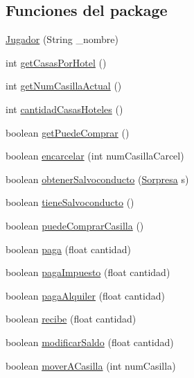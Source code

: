 \subsection*{Funciones del \textquotesingle{}package\textquotesingle{}}
\begin{DoxyCompactItemize}
\item 
\hyperlink{classcivitas_1_1Jugador_a493ce0ae2a6589460ff693b7c53fbd1e}{Jugador} (String \+\_\+nombre)
\item 
int \hyperlink{classcivitas_1_1Jugador_a0fd044d8f7c6d61718b389124f93ec17}{get\+Casas\+Por\+Hotel} ()
\item 
int \hyperlink{classcivitas_1_1Jugador_ae60e7e2b72553535a3100e11a89e6948}{get\+Num\+Casilla\+Actual} ()
\item 
int \hyperlink{classcivitas_1_1Jugador_af26359708ca0a967152c3e38ef0e0c6b}{cantidad\+Casas\+Hoteles} ()
\item 
boolean \hyperlink{classcivitas_1_1Jugador_a1b548df1bff7883664b0848408ed0232}{get\+Puede\+Comprar} ()
\item 
boolean \hyperlink{classcivitas_1_1Jugador_acc3fb8fdf45c820102c69472605abd3f}{encarcelar} (int num\+Casilla\+Carcel)
\item 
boolean \hyperlink{classcivitas_1_1Jugador_a0e052cf2f305003ab8a2084b643ff9bb}{obtener\+Salvoconducto} (\hyperlink{classcivitas_1_1Sorpresa}{Sorpresa} s)
\item 
boolean \hyperlink{classcivitas_1_1Jugador_a378e9a4405d9c44defeddd7488f5a9f9}{tiene\+Salvoconducto} ()
\item 
boolean \hyperlink{classcivitas_1_1Jugador_acfcfe8a5b5d26b2293cc727cd27acfac}{puede\+Comprar\+Casilla} ()
\item 
boolean \hyperlink{classcivitas_1_1Jugador_a5a7a0ba48bd151a808fa2f3edeecf75f}{paga} (float cantidad)
\item 
boolean \hyperlink{classcivitas_1_1Jugador_a5d3aa6cc2657a3f7e5b31c947e9035ca}{paga\+Impuesto} (float cantidad)
\item 
boolean \hyperlink{classcivitas_1_1Jugador_af63b04e25bc75ac3857bf0d6766cfc72}{paga\+Alquiler} (float cantidad)
\item 
boolean \hyperlink{classcivitas_1_1Jugador_aeadc08e13f894f3b86f004bfede49b8a}{recibe} (float cantidad)
\item 
boolean \hyperlink{classcivitas_1_1Jugador_ae091c2f1256a809aab42c1478056a861}{modificar\+Saldo} (float cantidad)
\item 
boolean \hyperlink{classcivitas_1_1Jugador_af227e8b7b1b41f042f24e7f65062aa7c}{mover\+A\+Casilla} (int num\+Casilla)

\end{DoxyCompactItemize}
